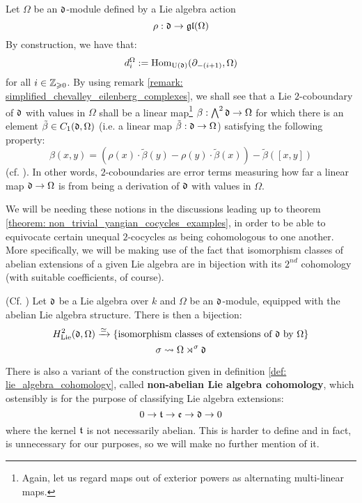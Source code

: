         \begin{example} \label{example: low_degree_lie_coboundaries_with_non-trivial_coefficients}
            Let $\Omega$ be an $\mathfrak{d}$-module defined by a Lie algebra action
                $$\rho: \mathfrak{d} \to \mathfrak{gl}(\Omega)$$
            By construction, we have that:
                $$d_i^\Omega := \mathrm{Hom}_{\mathrm{U}(\mathfrak{d})}(\partial_{-(i + 1)}, \Omega)$$
            for all $i \in \mathbb{Z}_{\geqslant 0}$. By using remark \ref{remark: simplified_chevalley_eilenberg_complexes}, we shall see that a Lie $2$-coboundary of $\mathfrak{d}$ with values in $\Omega$ shall be a linear map\footnote{Again, let us regard maps out of exterior powers as alternating multi-linear maps.} $\beta: \bigwedge^2 \mathfrak{d} \to \Omega$ for which there is an element $\tilde{\beta} \in C_1(\mathfrak{d}, \Omega)$ (i.e. a linear map $\tilde{\beta}: \mathfrak{d} \to \Omega$) satisfying the following property:
                $$\beta(x, y) = \left( \rho(x) \cdot \tilde{\beta}(y) - \rho(y) \cdot \tilde{\beta}(x) \right) - \tilde{\beta}([x, y])$$
            (cf. \cite[Equation 1.6, p. 421]{kassel_quantum_groups}). In other words, $2$-coboundaries are error terms measuring how far a linear map $\mathfrak{d} \to \Omega$ is from being a derivation of $\mathfrak{d}$ with values in $\Omega$.
        \end{example}

        We will be needing these notions in the discussions leading up to theorem \ref{theorem: non_trivial_yangian_cocycles_examples}, in order to be able to equivocate certain unequal $2$-cocycles as being cohomologous to one another. More specifically, we will be making use of the fact that isomorphism classes of abelian extensions of a given Lie algebra are in bijection with its $2^{nd}$ cohomology (with suitable coefficients, of course).
        \begin{theorem} \label{theorem: H^2_of_lie_algebras_and_abelian_extensions}
            (Cf. \cite[Theorem VII.3.3]{hilton_stammbach_homological_algebra}) Let $\mathfrak{d}$ be a Lie algebra over $k$ and $\Omega$ be an $\mathfrak{d}$-module, equipped with the abelian Lie algebra structure. There is then a bijection:
                $$H^2_{\mathrm{Lie}}(\mathfrak{d}, \Omega) \xrightarrow[]{\simeq} \{ \text{isomorphism classes of extensions of $\mathfrak{d}$ by $\Omega$} \}$$
                $$\sigma \leadsto \Omega \rtimes^{\sigma} \mathfrak{d}$$
        \end{theorem}
        
        \begin{remark}
            There is also a variant of the construction given in definition \ref{def: lie_algebra_cohomology}, called \textbf{non-abelian Lie algebra cohomology}, which ostensibly is for the purpose of classifying Lie algebra extensions:
                $$0 \to \mathfrak{t} \to \mathfrak{e} \to \mathfrak{d} \to 0$$
            where the kernel $\mathfrak{t}$ is not necessarily abelian. This is harder to define and in fact, is unnecessary for our purposes, so we will make no further mention of it.
        \end{remark}
    

